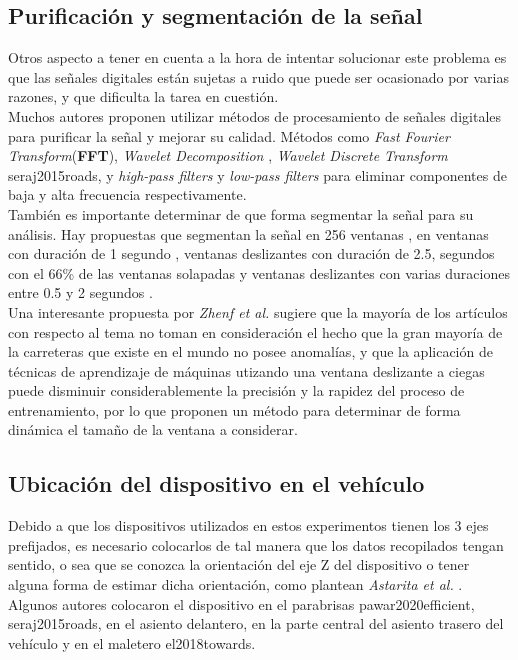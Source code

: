 	\subsection{Purificación y segmentación de la señal}
		Otros aspecto a tener en cuenta a la hora de intentar solucionar este problema es que las señales digitales están sujetas a ruido que puede ser
		ocasionado por varias razones, y que dificulta la tarea en cuestión.\\
		\indent Muchos autores proponen utilizar métodos de procesamiento de señales digitales para purificar la señal y mejorar su calidad. Métodos como \emph
		{Fast Fourier Transform}(\textbf{FFT}), \emph{Wavelet Decomposition} , \emph{Wavelet Discrete Transform} \brackcite
		{seraj2015roads}, y \emph{high-pass filters} y \emph{low-pass filters}  para eliminar
		componentes de baja y alta frecuencia respectivamente.\\
		\indent También es importante determinar de que forma segmentar la señal para su análisis. Hay propuestas que segmentan la señal en 256 ventanas
		, en ventanas con duración de 1 segundo , ventanas deslizantes con duración de 2.5,
		segundos con el 66\% de las ventanas solapadas  y ventanas deslizantes con varias duraciones entre 0.5 y 2 segundos
		.\\
		\indent Una interesante propuesta por \emph{Zhenf et al.}  sugiere que la mayoría de los artículos con respecto al tema no
		toman en consideración el hecho que la gran mayoría de la carreteras que existe en el mundo no posee anomalías, y que la aplicación de técnicas
		de aprendizaje de máquinas utizando una ventana deslizante a ciegas puede disminuir considerablemente la precisión y la rapidez del proceso de
		entrenamiento, por lo que proponen un método para determinar de forma dinámica el tamaño de la ventana a considerar.\\
		
	\subsection{Ubicación del dispositivo en el vehículo}
		Debido a que los dispositivos utilizados en estos experimentos tienen los 3 ejes prefijados, es necesario colocarlos de tal manera que los
		datos recopilados tengan sentido, o sea que se conozca la orientación del eje Z del dispositivo o tener alguna forma de estimar dicha orientación,
		como plantean \emph{Astarita et al.} . Algunos autores colocaron el dispositivo en el parabrisas \brackcite
		{pawar2020efficient, seraj2015roads}, en el asiento delantero, en la parte central del asiento trasero del vehículo y en el maletero \brackcite
		{el2018towards}.
		

